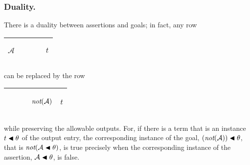 \documentclass[runningheads]{llncs}
\DeclareMathOperator{\unot}{\emph{not}\kern-.0pt}
\begin{document}






\subsubsection{Duality.}  There is a duality between assertions and goals; in fact, any row
 \begin{center}
\begin{tabular}{T}
\hline
 \begin{center}$\mathcal{A}$\end{center} & \begin{center}$\qquad$\end{center} & \begin{center}$t$\end{center}\\
 
 \hline
\end{tabular}
\end{center}
 
\noindent can be replaced by the row
 


   \begin{center}
\begin{tabular} {T}
\hline
    \begin{center}$\qquad$\end{center} & \begin{center}$ \unot(\mathcal{A})$\end{center} & \begin{center}$t$\end{center} \\
 
 \hline
\end{tabular}
\end{center}

\noindent while preserving the allowable outputs.  For, if there is a term that is an instance $t\blacktriangleleft \theta$ of the output entry, the corresponding instance of the goal, $ (\unot(\mathcal{A}))\apply \theta$, that is  $ \unot (\mathcal{A}\apply \theta)$, is true precisely when the corresponding instance of the assertion, $\mathcal{A}\blacktriangleleft \theta$, is false.
\end{document}
